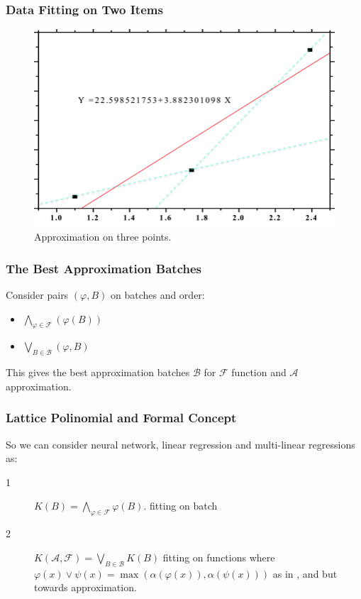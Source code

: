 \documentclass{beamer}
\newcommand {\FF}                         {\mathcal{F}}
\newcommand {\A}                          {\mathcal{A}}
\newcommand {\B}                          {\mathcal{B}}
\newcommand {\f}                          {\varphi}
\newcommand {\p}                          {\psi}
\begin{document}
\begin{frame}
    \frametitle{Data Fitting on Two Items}
    \begin{figure}
        \includegraphics[width=\linewidth]{linear_three_1.png}
        \caption{Approximation on three points.}
        \label{fig:linthree}
    \end{figure}
\end{frame}

\begin{frame}
    \frametitle{The Best Approximation Batches}
    Consider pairs $(\f, B)$ on batches and order:
    \begin{itemize}
        \item $\bigwedge_{\f \in \FF}{(\f(B))}$
        \item $\bigvee_{B \in \B}{(\f, B)}$
    \end{itemize}
    This gives the best approximation batches $\B$ for $\FF$ function and $\A$ approximation.
\end{frame}

\begin{frame}
    \frametitle{Lattice Polinomial and Formal Concept}
    So we can consider neural network, linear regression and multi-linear regressions as:
    \begin{description}
        \item[1] $K(B) = \bigwedge_{\f \in \FF}{\f(B)}.$ fitting on batch
        \item[2] $K(\A, \FF) = \bigvee_{B \in \B}{K(B)}$ fitting on functions
        where $\f(x) \lor \p(x) = \max{(\alpha(\f(x)), \alpha(\p(x)))}$ as in \cite{PWLRegConf},
        \cite{PWLLattMinp1} and \cite{PWLLattMinp2} but towards approximation.
    \end{description}

\end{frame}
\end{document}
